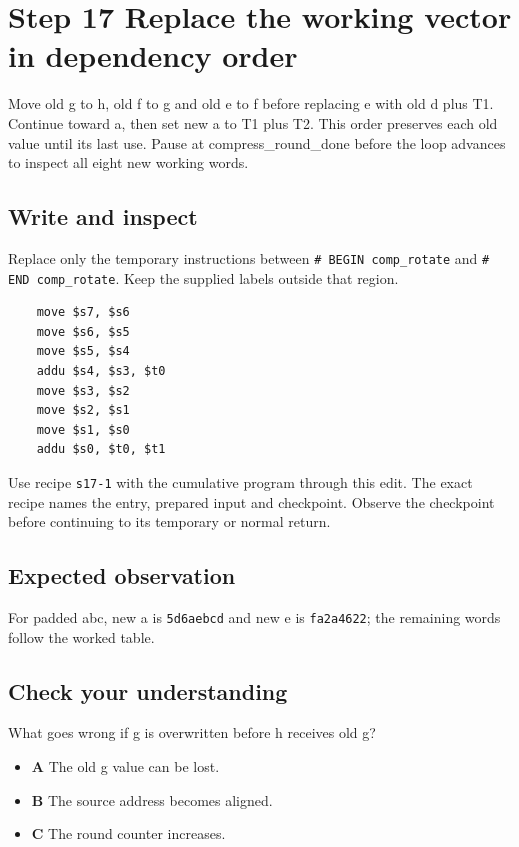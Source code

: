 \section{Step 17 Replace the working vector in dependency order}\label{sha-s17}

Move old g to h, old f to g and old e to f before replacing e with old d plus T1. Continue toward a, then set new a to T1 plus T2. This order preserves each old value until its last use. Pause at compress\_round\_done before the loop advances to inspect all eight new working words.

\subsection{Write and inspect}
Replace only the temporary instructions between \texttt{\# BEGIN comp\_rotate} and \texttt{\# END comp\_rotate}. Keep the supplied labels outside that region.

\begin{verbatim}
    move $s7, $s6
    move $s6, $s5
    move $s5, $s4
    addu $s4, $s3, $t0
    move $s3, $s2
    move $s2, $s1
    move $s1, $s0
    addu $s0, $t0, $t1
\end{verbatim}

Use recipe \texttt{s17-1} with the cumulative program through this edit. The exact recipe names the entry, prepared input and checkpoint. Observe the checkpoint before continuing to its temporary or normal return.

\subsection{Expected observation}
For padded abc, new a is \texttt{5d6aebcd} and new e is \texttt{fa2a4622}; the remaining words follow the worked table.

\subsection{Check your understanding}
What goes wrong if g is overwritten before h receives old g?

\begin{itemize}
\item \textbf{A} The old g value can be lost.
\item \textbf{B} The source address becomes aligned.
\item \textbf{C} The round counter increases.
\end{itemize}
